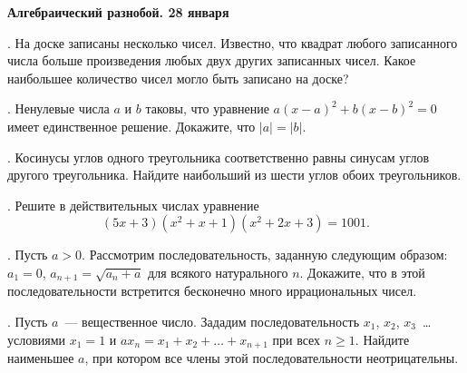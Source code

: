 \centerline{\bf Алгебраический разнобой. 28 января}

. На доске записаны несколько чисел. Известно, что квадрат любого записанного числа больше произведения 
любых двух других записанных чисел. Какое наибольшее количество чисел могло быть записано на доске?

. Ненулевые числа $a$ и $b$ таковы, что уравнение $a(x-a)^2+b(x-b)^2=0$ имеет единственное решение. 
Докажите, что $|a|=|b|$.

. Косинусы углов одного треугольника соответственно равны синусам углов другого треугольника. 
Найдите наибольший из шести углов обоих треугольников.

. Решите в действительных числах уравнение 
\[
(5x+3)(x^2+x+1)(x^2+2x+3)=1001. 
\]

. Пусть $a>0$. Рассмотрим последовательность, заданную следующим образом: $a_1=0$, $a_{n+1}=\sqrt{a_n+a}$
для всякого натурального $n$. Докажите, что в этой последовательности встретится бесконечно много иррациональных чисел.

. Пусть $a$~--- вещественное число. Зададим последовательность $x_1$, $x_2$, $x_3$~\ldots 
условиями $x_1=1$ и $ax_n=x_1+x_2+\ldots+x_{n+1}$ при всех $n\geqslant 1$. 
Найдите наименьшее $a$, при котором все члены этой последовательности неотрицательны.

